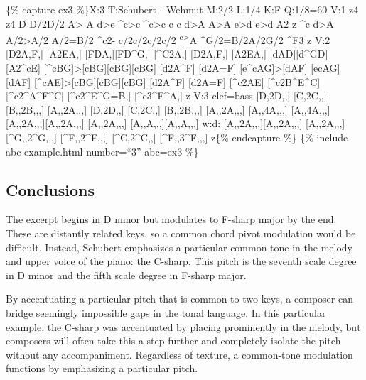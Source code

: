 \documentclass{book}
\begin{document}
\{\% capture ex3 \%\}X:3 T:Schubert - Wehmut M:2/2 L:1/4 K:F Q:1/8=60 V:1
z4\textbar{} z4\textbar{} D D/2D/2 A\textgreater{} A\textbar{} d\textgreater e
\^{}c\textgreater c\textbar{} \^{}c\textgreater c c c\textbar{}
d\textgreater A A\textgreater A\textbar{} e\textgreater d
e\textgreater d\textbar{} A2 z \^{}c\textbar{} d\textgreater A
A/2\textgreater A/2 A/2=B/2\textbar{} \^{}c2- c/2c/2c/2c/2\textbar{}
\textsuperscript{c\textgreater{}}A \^{}G/2=B/2A/2G/2\textbar{} \^{}F3
z\textbar{]} V:2 {[}D2A,F,{]} {[}A2EA,{]}\textbar{} {[}FDA,{]}{[}FD\^{}G,{]}
{[}\^{}C2A,{]}\textbar{} {[}D2A,F,{]} {[}A2EA,{]}\textbar{}
{[}dAD{]}{[}d\^{}GD{]} {[}A2\^{}cE{]}\textbar{}
{[}\^{}cBG{]}\textgreater{[}cBG{]}{[}cBG{]}{[}cBG{]}\textbar{} {[}d2A\^{}F{]}
{[}d2A=F{]}\textbar{} {[}e\^{}cAG{]}\textgreater{[}dAF{]}
{[}ecAG{]}{[}dAF{]}\textbar{}
{[}\^{}cAE{]}\textgreater{[}cBG{]}{[}cBG{]}{[}cBG{]}\textbar{} {[}d2A\^{}F{]}
{[}d2A=F{]}\textbar{} {[}\^{}c2AE{]} {[}\^{}c2B\^{}E\^{}C{]}\textbar{}
{[}\^{}c2\^{}A\^{}F\^{}C{]} {[}\^{}c2\^{}E\^{}G=B,{]}\textbar{}
{[}\^{}c3\^{}F\^{}A,{]} z\textbar{]} V:3 clef=bass {[}D,2D,,{]}
{[}C,2C,,{]}\textbar{} {[}B,,2B,,,{]} {[}A,,2A,,,{]}\textbar{} {[}D,2D,,{]}
{[}C,2C,,{]}\textbar{} {[}B,,2B,,,{]} {[}A,,2A,,,{]}\textbar{}
{[}A,,4A,,,{]}\textbar{} {[}A,,4A,,,{]}\textbar{}
{[}A,,2A,,,{]}{[}A,,2A,,,{]}\textbar{} {[}A,,2A,,,{]}
{[}A,,A,,,{]}{[}A,,A,,,{]}\textbar{} w:d:
{[}A,,2A,,,{]}{[}A,,2A,,,{]}\textbar{}
{[}A,,2A,,,{]}{[}\^{}G,,2\^{}G,,,{]}\textbar{} {[}\^{}F,,2\^{}F,,,{]}
{[}\^{}C,2\^{}C,,{]}\textbar{} {[}\^{}F,,3\^{}F,,,{]} z\textbar{]}\{\%
endcapture \%\} \{\% include abc-example.html number=``3'' abc=ex3 \%\}

\hypertarget{conclusions-57}{%
\subsection{Conclusions}\label{conclusions-57}}

The excerpt begins in D minor but modulates to F-sharp major by the end. These
are distantly related keys, so a common chord pivot modulation would be
difficult. Instead, Schubert emphasizes a particular common tone in the melody
and upper voice of the piano: the C-sharp. This pitch is the seventh scale
degree in D minor and the fifth scale degree in F-sharp major.

By accentuating a particular pitch that is common to two keys, a composer can
bridge seemingly impossible gaps in the tonal language. In this particular
example, the C-sharp was accentuated by placing prominently in the melody, but
composers will often take this a step further and completely isolate the pitch
without any accompaniment. Regardless of texture, a common-tone modulation
functions by emphasizing a particular pitch.
\end{document}
